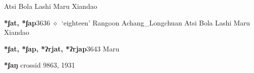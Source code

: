 \begin{list}{}{\leftmargin=1.5em \itemindent=-1.5em}
\hspace{1ex}
         Atsi 
\hspace{1ex}
         Bola 
\hspace{1ex}
         Lashi 
\hspace{1ex}
         Maru 
\hspace{1ex}
         Xiandao 
  \item {\footnotesize \textbf{*ʃat, *ʃap}}{\tiny 3636}
\hspace{1ex}
         $\diamond$~`eighteen'
         Rangoon 
\hspace{1ex}
         Achang\_Longchuan 
\hspace{1ex}
         Atsi 
\hspace{1ex}
         Bola 
\hspace{1ex}
         Lashi 
\hspace{1ex}
         Maru 
\hspace{1ex}
         Xiandao 
  \item {\footnotesize \textbf{*ʃat, *ʃap, *ʔrjat, *ʔrjap}}{\tiny 3643}
\hspace{1ex}
         Maru 
  \end{list}
\item
\textbf{*ʃaŋ}
  {\tiny crossid 9863, 1931}
